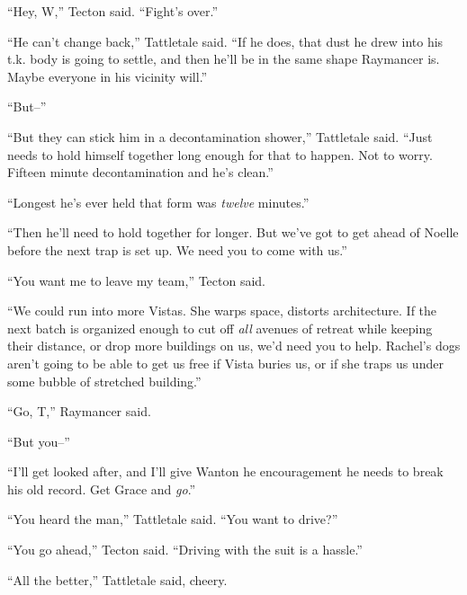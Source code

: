 ``Hey, W,'' Tecton said.  ``Fight's over.''



``He can't change back,'' Tattletale said.  ``If he does, that dust he drew into his t.k. body is going to settle, and then he'll be in the same shape Raymancer is.  Maybe everyone in his vicinity will.''



``But--''



``But they can stick him in a decontamination shower,'' Tattletale said.  ``Just needs to hold himself together long enough for that to happen.  Not to worry.  Fifteen minute decontamination and he's clean.''



``Longest he's ever held that form was \emph{twelve} minutes.''



``Then he'll need to hold together for longer.  But we've got to get ahead of Noelle before the next trap is set up.  We need you to come with us.''



``You want me to leave my team,'' Tecton said.



``We could run into more Vistas.  She warps space, distorts architecture.  If the next batch is organized enough to cut off \emph{all} avenues of retreat while keeping their distance, or drop more buildings on us, we'd need you to help.  Rachel's dogs aren't going to be able to get us free if Vista buries us, or if she traps us under some bubble of stretched building.''



``Go, T,'' Raymancer said.



``But you--''



``I'll get looked after, and I'll give Wanton he encouragement he needs to break his old record.  Get Grace and \emph{go}.''



``You heard the man,'' Tattletale said.  ``You want to drive?''



``You go ahead,'' Tecton said.  ``Driving with the suit is a hassle.''



``All the better,'' Tattletale said, cheery.




